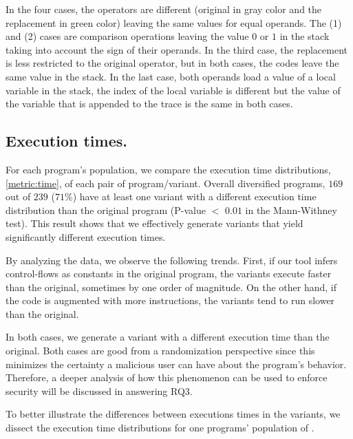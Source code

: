 

In the four cases, the operators are different (original in gray color and the replacement in green color) leaving the same values for equal operands.
The (1) and (2) cases are comparison operations leaving the value $0$ or $1$ in the stack taking into account the sign of their operands.  In the third case, the replacement is less restricted to the original operator, but in both cases, the codes leave the same value in the stack. In the last case, both operands load a value of a local variable in the stack, the index of the local variable is different but the value of the variable that is appended to the trace is the same in both cases. 

\subsection*{Execution times.}


For each program's population, we compare the execution time distributions, \autoref{metric:time}, of each pair of program/variant.
Overall diversified programs, $169$ out of $239$ ($71\%$) have at least one variant with a different execution time distribution than the original program (P-value $<$ $0.01$ in the Mann-Withney test). This result shows that we effectively generate variants that yield significantly different execution times.

By analyzing the data, we observe the following trends. First, if our tool infers control-flows as constants in the original program, the variants execute faster than the original, sometimes by one order of magnitude. On the other hand, if the code is augmented with more instructions, the variants tend to run slower than the original. 

In both cases, we generate a variant with a different execution time than the original. Both cases are good from a randomization perspective since this minimizes the certainty a malicious user can have about the program's behavior. Therefore, a deeper analysis of how this phenomenon can be used to enforce security will be discussed in answering RQ3.

To better illustrate the differences between executions times in the variants, we dissect the execution time distributions for one programs' population of \corpusrosetta. 


